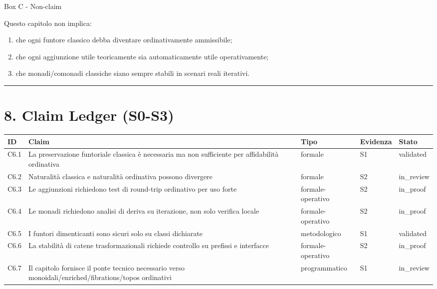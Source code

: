 Box C - Non-claim

Questo capitolo non implica:

\begin{enumerate}
\def\labelenumi{\arabic{enumi}.}
\tightlist
\item
  che ogni funtore classico debba diventare ordinativamente ammissibile;
\item
  che ogni aggiunzione utile teoricamente sia automaticamente utile operativamente;
\item
  che monadi/comonadi classiche siano sempre stabili in scenari reali iterativi.
\end{enumerate}

\begin{center}\rule{0.5\linewidth}{0.5pt}\end{center}

\section{8. Claim Ledger (S0-S3)}

{\def\LTcaptype{none} %
\begin{longtable}[]{@{}lllll@{}}
\toprule\noalign{}
ID & Claim & Tipo & Evidenza & Stato \\
\midrule\noalign{}
\endhead
\bottomrule\noalign{}
\endlastfoot
C6.1 & La preservazione funtoriale classica è necessaria ma non sufficiente per affidabilità ordinativa & formale & S1 & validated \\
C6.2 & Naturalità classica e naturalità ordinativa possono divergere & formale & S2 & in\_review \\
C6.3 & Le aggiunzioni richiedono test di round-trip ordinativo per uso forte & formale-operativo & S2 & in\_proof \\
C6.4 & Le monadi richiedono analisi di deriva su iterazione, non solo verifica locale & formale-operativo & S2 & in\_proof \\
C6.5 & I funtori dimenticanti sono sicuri solo su classi dichiarate & metodologico & S1 & validated \\
C6.6 & La stabilità di catene trasformazionali richiede controllo su prefissi e interfacce & formale-operativo & S2 & in\_proof \\
C6.7 & Il capitolo fornisce il ponte tecnico necessario verso monoidali/enriched/fibrations/topos ordinativi & programmatico & S1 & in\_review \\
\end{longtable}
}

